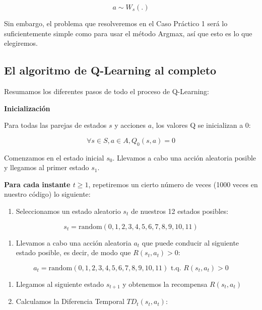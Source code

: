 \documentclass[]{book}
\providecommand{\tightlist}{%
  \setlength{\itemsep}{0pt}\setlength{\parskip}{0pt}}
\begin{document}
\[a \sim W_s(.)\]

Sin embargo, el problema que resolveremos en el Caso Práctico 1 será lo suficientemente simple como para usar el método Argmax, así que esto es lo que elegiremos.

\hypertarget{el-algoritmo-de-q-learning-al-completo}{%
\subsection{El algoritmo de Q-Learning al completo}\label{el-algoritmo-de-q-learning-al-completo}}

Resumamos los diferentes pasos de todo el proceso de Q-Learning:

\textbf{Inicialización}

Para todas las parejas de estados \(s\) y acciones \(a\), los valores Q se inicializan a 0:

\[\forall s \in S, a \in A, Q_0(s,a) = 0\]

Comenzamos en el estado inicial \(s_0\). Llevamos a cabo una acción aleatoria posible y llegamos al primer estado \(s_1\).

\textbf{Para cada instante \(t \ge 1\)}, repetiremos un cierto número de veces (1000 veces en nuestro código) lo siguiente:

\begin{enumerate}
\def\labelenumi{\arabic{enumi}.}
\tightlist
\item
  Seleccionamos un estado aleatorio \(s_t\) de nuestros 12 estados posibles:
\end{enumerate}

\[s_t = \textrm{random}(0,1,2,3,4,5,6,7,8,9,10,11)\]

\begin{enumerate}
\def\labelenumi{\arabic{enumi}.}
\setcounter{enumi}{1}
\tightlist
\item
  Llevamos a cabo una acción aleatoria \(a_t\) que puede conducir al siguiente estado posible, es decir, de modo que \(R(s_t,a_t) > 0\):
\end{enumerate}

\[a_t = \textrm{random}(0,1,2,3,4,5,6,7,8,9,10,11) \textrm{ t.q. } R(s_t,a_t) > 0\]

\begin{enumerate}
\def\labelenumi{\arabic{enumi}.}
\setcounter{enumi}{2}
\item
  Llegamos al siguiente estado \(s_{t + 1}\) y obtenemos la recompensa \(R(s_t,a_t)\)
\item
  Calculamos la Diferencia Temporal \(TD_t(s_t,a_t)\):
\end{enumerate}
\end{document}
